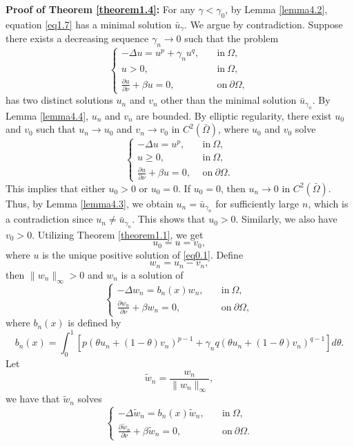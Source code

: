 \documentclass[12pt,reqno]{amsart}
\numberwithin{equation}{section}
\theoremstyle{definition}
\begin{document}
{\bf Proof of Theorem \ref{theorem1.4}:} For any $\gamma<\gamma_0$, by Lemma \ref{lemma4.2}, equation \eqref{eq1.7} has a minimal solution $\bar{u}_\gamma$. We argue by contradiction. Suppose there exists a decreasing sequence $\gamma_n\to0$ such that the problem 
\begin{equation*}
\begin{cases}
-\Delta u=u^p+\gamma_n u^q,\quad &\text{in}\ \Omega,\\
u>0,  \quad &\text{in}\ \Omega,\\
\frac{\partial u}{\partial \nu}+\beta u=0, &\text{on}\ \partial\Omega,
\end{cases}
\end{equation*}
has two distinct solutions $u_n$ and $v_n$ other than the minimal solution $\bar{u}_{\gamma_n}$. By Lemma \ref{lemma4.4}, $u_n$ and $v_n$ are bounded. By elliptic regularity, there exist $u_0$ and $v_0$ such that $u_n\to u_0$ and $v_n\to v_0$ in $C^2(\bar{\Omega})$, where $u_0$ and $v_0$ solve 
\begin{equation}\label{m5}
\begin{cases}
-\Delta u=u^p,\quad &\text{in}\ \Omega,\\
u\ge0,  \quad &\text{in}\ \Omega,\\
\frac{\partial u}{\partial \nu}+\beta u=0, &\text{on}\ \partial\Omega.
\end{cases}
\end{equation}
This implies that either $u_0>0$ or $u_0=0$. If $u_0=0$, then $u_n\to 0$ in $C^2(\bar{\Omega})$. Thus, by Lemma \ref{lemma4.3}, we obtain $u_n=\bar{u}_{\gamma_n}$ for sufficiently large $n$, which is a contradiction since $u_n\ne \bar{u}_{\gamma_n}$. This shows that $u_0>0$. Similarly, we also have $v_0>0$. Utilizing Theorem \ref{theorem1.1}, we get 
$$
u_0=u=v_0,
$$
where $u$ is the unique positive solution of \eqref{eq0.1}. Define 
$$
w_n=u_n-v_n,
$$
then $\|w_n\|_\infty>0$ and $w_n$ is a solution of 
\begin{equation}
\begin{cases}
-\Delta w_n=b_n(x)w_n,\quad &\text{in}\ \Omega,\\
\frac{\partial w_n}{\partial\nu}+\beta w_n=0, &\text{on}\ \partial\Omega,
\end{cases}
\end{equation}
where $b_n(x)$ is defined by 
$$
b_n(x)=\int_0^1[p(\theta u_n+(1-\theta)v_n)^{p-1}+\gamma_nq(\theta u_n+(1-\theta)v_n)^{q-1}]d\theta.
$$
Let 
$$
\tilde{w}_n=\frac{w_n}{\|w_n\|_\infty},
$$
we have that $\tilde{w}_n$ solves 
\begin{equation*}
\begin{cases}
-\Delta \tilde{w}_n=b_n(x)\tilde{w}_n,\quad &\text{in}\ \Omega,\\
\frac{\partial \tilde{w}_n}{\partial\nu}+\beta \tilde{w}_n=0, &\text{on}\ \partial\Omega.
\end{cases}
\end{equation*}
\end{document}
